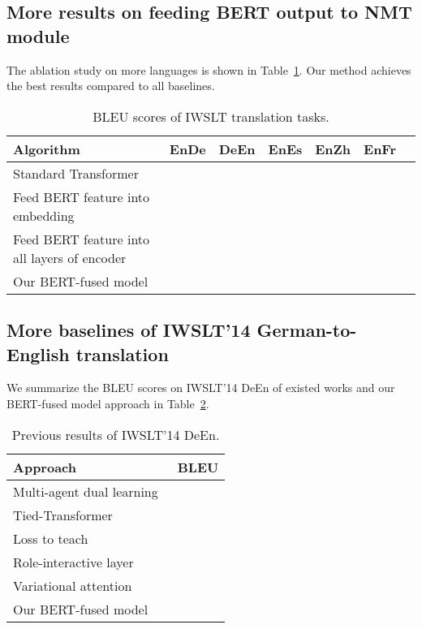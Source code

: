 \documentclass{article} \usepackage{iclr2020_conference,times}
\begin{document}
\subsection{More results on feeding BERT output to NMT module}\label{app:feeding}
The ablation study on more languages is shown in Table~\ref{tab:more_lang_ablation}. Our method achieves the best results compared to all baselines. 
\begin{table}[!htbp]
\centering
\caption{BLEU scores of IWSLT translation tasks.}
\begin{tabular}{lcccccc}
\toprule
Algorithm & EnDe & DeEn & EnEs & EnZh &EnFr \\
\midrule
Standard Transformer &  &  & & & \\
Feed BERT feature into embedding &  &  &  &  &   \\
Feed BERT feature into all layers of encoder &   &  &  &  & \\
Our BERT-fused model &  &  &&& \\
\bottomrule
\end{tabular}
\label{tab:more_lang_ablation}
\end{table}

\subsection{More baselines of IWSLT'14 German-to-English translation}\label{app:iwsltdeen}
We summarize the BLEU scores on IWSLT'14 DeEn of existed works and our BERT-fused model approach in Table~\ref{tab:summary:de2en:iwslt}. 


\begin{table}[!htbp]
\centering
\caption{Previous results of IWSLT'14 DeEn.}
\begin{tabular}{lc}
\toprule
Approach & BLEU \\ 
\midrule
Multi-agent dual learning~\citep{wang2018multi}  &   \\
Tied-Transformer~\citep{xia2019tied}  &   \\
Loss to teach~\citep{wu2018learning} &  \\
Role-interactive layer~\citep{weissenborn2019contextualized} &  \\
Variational attention~\citep{deng2018latent} &  \\
\midrule
Our BERT-fused model &  \\
\bottomrule
\end{tabular}
\label{tab:summary:de2en:iwslt}
\end{table}
\end{document}

